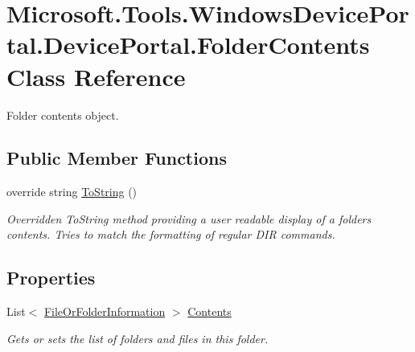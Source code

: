 \hypertarget{class_microsoft_1_1_tools_1_1_windows_device_portal_1_1_device_portal_1_1_folder_contents}{}\section{Microsoft.\+Tools.\+Windows\+Device\+Portal.\+Device\+Portal.\+Folder\+Contents Class Reference}
\label{class_microsoft_1_1_tools_1_1_windows_device_portal_1_1_device_portal_1_1_folder_contents}


Folder contents object.  


\subsection*{Public Member Functions}
\begin{DoxyCompactItemize}
\item 
override string \hyperlink{class_microsoft_1_1_tools_1_1_windows_device_portal_1_1_device_portal_1_1_folder_contents_afb10b6cc5932820926b5a57425b11497}{To\+String} ()
\begin{DoxyCompactList}\small\item\em Overridden To\+String method providing a user readable display of a folder\textquotesingle{}s contents. Tries to match the formatting of regular D\+IR commands. \end{DoxyCompactList}\end{DoxyCompactItemize}
\subsection*{Properties}
\begin{DoxyCompactItemize}
\item 
List$<$ \hyperlink{class_microsoft_1_1_tools_1_1_windows_device_portal_1_1_device_portal_1_1_file_or_folder_information}{File\+Or\+Folder\+Information} $>$ \hyperlink{class_microsoft_1_1_tools_1_1_windows_device_portal_1_1_device_portal_1_1_folder_contents_aafc71f3d95024b0a5f550a10585759ea}{Contents}
\begin{DoxyCompactList}\small\item\em Gets or sets the list of folders and files in this folder. \end{DoxyCompactList}\end{DoxyCompactItemize}


